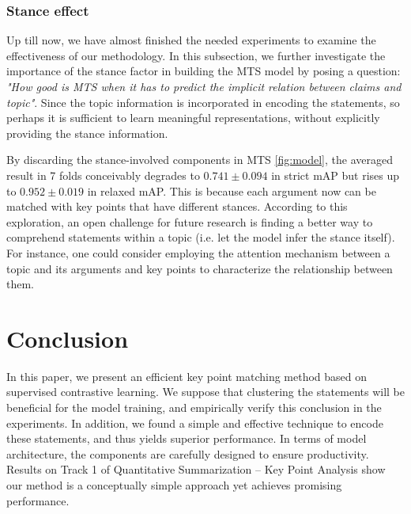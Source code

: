 \subsubsection{Stance effect}
\label{sec:stance}
Up till now, we have almost finished the needed experiments to examine the effectiveness of our methodology. In this subsection, we further investigate the importance of the stance factor in building the MTS model by posing a question: \textit{"How good is MTS when it has to predict the implicit relation between claims and topic"}. Since the topic information is incorporated in encoding the statements, so perhaps it is sufficient to learn meaningful representations, without explicitly providing the stance information.

By discarding the stance-involved components in MTS \ref{fig:model}, the averaged result in 7 folds conceivably degrades to $0.741\pm0.094$ in strict mAP but rises up to $0.952\pm0.019$ in relaxed mAP. This is because each argument now can be matched with key points that have different stances. According to this exploration, an open challenge for future research is finding a better way to comprehend statements within a topic (i.e. let the model infer the stance itself). For instance, one could consider employing the attention mechanism between a topic and its arguments and key points to characterize the relationship between them.

\section{Conclusion}
\label{sec:conclusion}

In this paper, we present an efficient key point matching method based on supervised contrastive learning. We suppose that clustering the statements will be beneficial for the model training, and empirically verify this conclusion in the experiments. In addition, we found a simple and effective technique to encode these statements, and thus yields superior performance. In terms of model architecture, the components are carefully designed to ensure productivity. Results on Track 1 of Quantitative Summarization – Key Point Analysis show our method is a conceptually simple approach yet achieves promising performance.